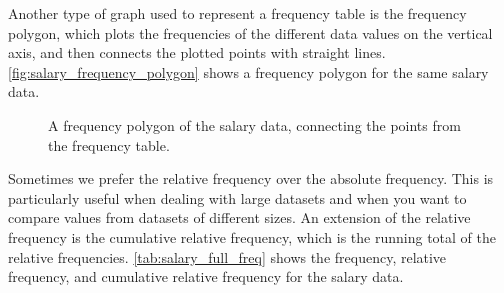 Another type of graph used to represent a frequency table is the frequency polygon, which
plots the frequencies of the different data values on the vertical axis, and then connects the
plotted points with straight lines. \autoref{fig:salary_frequency_polygon} shows a frequency polygon for the same salary data.

\begin{figure}[htbp]
\centering
{}
\caption{A frequency polygon of the salary data, connecting the points from the frequency table.}
\label{fig:salary_frequency_polygon}
\end{figure}

Sometimes we prefer the relative frequency over the absolute frequency. This is particularly useful when dealing with large datasets and when you want to compare values from datasets of different sizes. An extension of the relative frequency is the cumulative relative frequency, which is the running total of the relative frequencies. \autoref{tab:salary_full_freq} shows the frequency, relative frequency, and cumulative relative frequency for the salary data.

